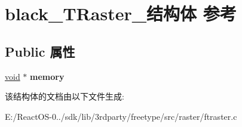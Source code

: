 \hypertarget{structblack___t_raster__}{}\section{black\+\_\+\+T\+Raster\+\_\+结构体 参考}
\label{structblack___t_raster__}
\subsection*{Public 属性}
\begin{DoxyCompactItemize}
\item 
\mbox{\label{structblack___t_raster___ad6a3fa2e13dab3a132c2db8d7975ed62}} 
\hyperlink{interfacevoid}{void} $\ast$ {\bfseries memory}
\end{DoxyCompactItemize}


该结构体的文档由以下文件生成\+:\begin{DoxyCompactItemize}
\item 
E\+:/\+React\+O\+S-\/0../sdk/lib/3rdparty/freetype/src/raster/ftraster.\+c\end{DoxyCompactItemize}
